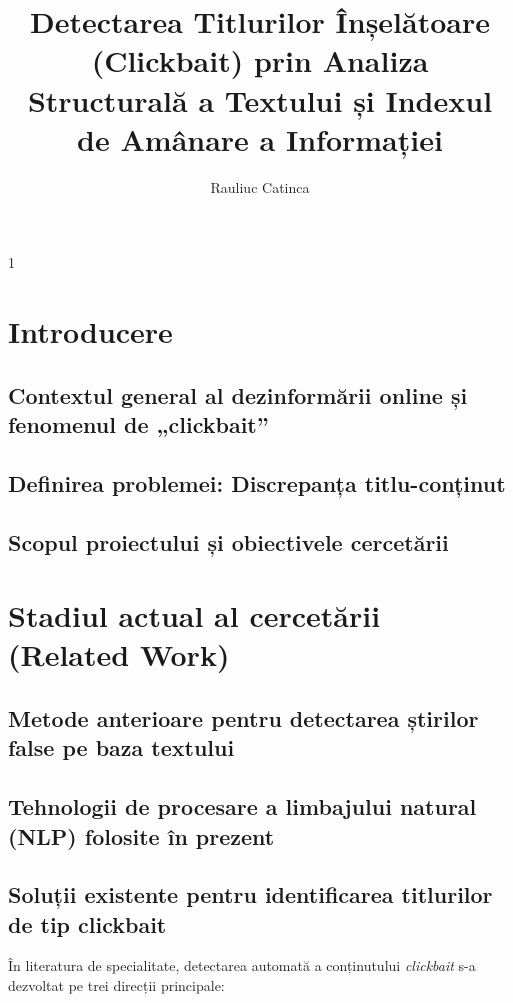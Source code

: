 \documentclass[12pt, a4paper]{article}
\title{\textbf{Detectarea Titlurilor Înșelătoare (Clickbait) prin Analiza Structurală a Textului și Indexul de Amânare a Informației}}
\author{Rauliuc Catinca}
\date{} %
\begin{document}
\maketitle

\begin{spacing}{1}
\tableofcontents
\end{spacing}
\newpage

\section{Introducere}
\subsection{Contextul general al dezinformării online și fenomenul de „clickbait”}

\subsection{Definirea problemei: Discrepanța titlu-conținut}

\subsection{Scopul proiectului și obiectivele cercetării}


\section{Stadiul actual al cercetării (Related Work)}
\subsection{Metode anterioare pentru detectarea știrilor false pe baza textului}
\subsection{Tehnologii de procesare a limbajului natural (NLP) folosite în prezent}
\subsection{Soluții existente pentru identificarea titlurilor de tip clickbait}

În literatura de specialitate, detectarea automată a conținutului \textit{clickbait} s-a dezvoltat pe trei direcții principale:
\end{document}
